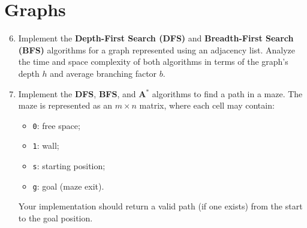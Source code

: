 \documentclass{article}
\begin{document}
\section*{Graphs}

\begin{enumerate}
    \setcounter{enumi}{5}
    \item Implement the \textbf{Depth-First Search (DFS)} and \textbf{Breadth-First Search (BFS)} algorithms for a graph represented using an adjacency list. Analyze the time and space complexity of both algorithms in terms of the graph's depth $h$ and average branching factor $b$.
    
    \item Implement the \textbf{DFS}, \textbf{BFS}, and \textbf{A$^*$} algorithms to find a path in a maze. The maze is represented as an $m \times n$ matrix, where each cell may contain:
    
    \begin{itemize}
        \item \texttt{0}: free space;
        \item \texttt{1}: wall;
        \item \texttt{s}: starting position;
        \item \texttt{g}: goal (maze exit).
    \end{itemize}
    
    Your implementation should return a valid path (if one exists) from the start to the goal position.
\end{enumerate}
\end{document}

